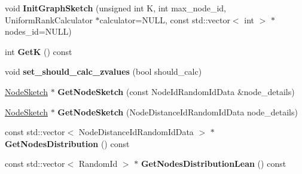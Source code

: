 \begin{DoxyCompactItemize}
\item 
\hypertarget{classall__distance__sketch_1_1GraphSketch_a400d1e090749a1bf2452c24cc6b8011e}{}void {\bfseries Init\+Graph\+Sketch} (unsigned int K, int max\+\_\+node\+\_\+id, Uniform\+Rank\+Calculator $\ast$calculator=N\+U\+L\+L, const std\+::vector$<$ int $>$ $\ast$nodes\+\_\+id=N\+U\+L\+L)\label{classall__distance__sketch_1_1GraphSketch_a400d1e090749a1bf2452c24cc6b8011e}

\item 
\hypertarget{classall__distance__sketch_1_1GraphSketch_a32fef9d13b965dd7b5a776596d888a41}{}int {\bfseries Get\+K} () const \label{classall__distance__sketch_1_1GraphSketch_a32fef9d13b965dd7b5a776596d888a41}

\item 
\hypertarget{classall__distance__sketch_1_1GraphSketch_a8d5aaa1b4e94e0361ea0b1afdbfcf8bc}{}void {\bfseries set\+\_\+should\+\_\+calc\+\_\+zvalues} (bool should\+\_\+calc)\label{classall__distance__sketch_1_1GraphSketch_a8d5aaa1b4e94e0361ea0b1afdbfcf8bc}

\item 
\hypertarget{classall__distance__sketch_1_1GraphSketch_ad0b0931712a19b47983a24ef73500316}{}\hyperlink{classall__distance__sketch_1_1NodeSketch}{Node\+Sketch} $\ast$ {\bfseries Get\+Node\+Sketch} (const Node\+Id\+Random\+Id\+Data \&node\+\_\+details)\label{classall__distance__sketch_1_1GraphSketch_ad0b0931712a19b47983a24ef73500316}

\item 
\hypertarget{classall__distance__sketch_1_1GraphSketch_a696af8492f42fbbb60afbc2ff2a68a96}{}\hyperlink{classall__distance__sketch_1_1NodeSketch}{Node\+Sketch} $\ast$ {\bfseries Get\+Node\+Sketch} (Node\+Distance\+Id\+Random\+Id\+Data node\+\_\+details)\label{classall__distance__sketch_1_1GraphSketch_a696af8492f42fbbb60afbc2ff2a68a96}

\item 
\hypertarget{classall__distance__sketch_1_1GraphSketch_ae31e8b23fc7063927b2368a06bc57adb}{}const std\+::vector$<$ Node\+Distance\+Id\+Random\+Id\+Data $>$ $\ast$ {\bfseries Get\+Nodes\+Distribution} () const \label{classall__distance__sketch_1_1GraphSketch_ae31e8b23fc7063927b2368a06bc57adb}

\item 
\hypertarget{classall__distance__sketch_1_1GraphSketch_af463db872f2cc5cc635dffe4aaf136e6}{}const std\+::vector$<$ Random\+Id $>$ $\ast$ {\bfseries Get\+Nodes\+Distribution\+Lean} () const \label{classall__distance__sketch_1_1GraphSketch_af463db872f2cc5cc635dffe4aaf136e6}


\end{DoxyCompactItemize}
